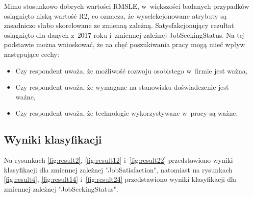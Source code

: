 Mimo stosunkowo dobrych wartości RMSLE, w~większości badanych przypadków osiągnięto niską wartość R2, co oznacza, że wyselekcjonowane atrybuty są zasadniczo słabo skorelowane ze zmienną zależną.
Satysfakcjonujący rezultat osiągnięto dla danych z~2017 roku i~zmiennej zależnej JobSeekingStatus.
Na tej podstawie można wnioskować, że na chęć poszukiwania pracy mogą mieć wpływ następujące cechy:

\begin{itemize}
    \item Czy respondent uważa, że możliwość rozwoju osobistego w~firmie jest ważna,
    \item Czy respondent uważa, że wymagane na stanowisku doświadczenie jest ważne,
    \item Czy respondent uważa, że technologie wykorzystywane w~pracy są ważne.
\end{itemize}

\subsection{Wyniki klasyfikacji}\label{sec:analysis:important-features:classification}

Na rysunkach \ref{fig:result2}, \ref{fig:result12} i~\ref{fig:result22} przedstawiono wyniki klasyfikacji dla zmiennej zależnej "JobSatisfaction", natomiast na rysunkach \ref{fig:result4}, \ref{fig:result14} i~\ref{fig:result24} przedstawiono wyniki klasyfikacji dla zmiennej zależnej "JobSeekingStatus".



